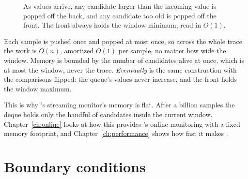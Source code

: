 \begin{figure}[h]
\centering
\begin{widefig}\end{widefig}
\caption{As values arrive, any candidate larger than the incoming value is popped off the back, and any candidate too old is popped off the front. The front always holds the window minimum, read in $O(1)$.}
\end{figure}

Each sample is pushed once and popped at most once, so across the whole trace the work is $O(n)$, amortized $O(1)$ per sample, no matter how wide the window. Memory is bounded by the number of candidates alive at once, which is at most the window, never the trace. \emph{Eventually} is the same construction with the comparisons flipped: the queue's values never increase, and the front holds the window maximum.

\begin{notebox}
This is why \sentil{}'s streaming monitor's memory is flat. After a billion samples the deque holds only the handful of candidates inside the current window. Chapter~\ref{ch:online} looks at how this provides \sentil{}'s online monitoring with a fixed memory footprint, and Chapter~\ref{ch:performance} shows how fast it makes \sentil{}.
\end{notebox}

\section{Boundary conditions}

